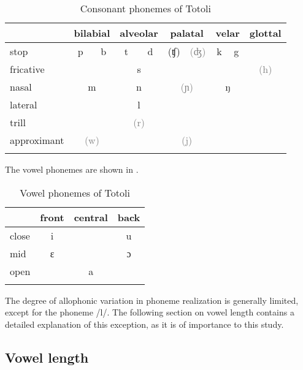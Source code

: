 \begin{table}
\caption{Consonant phonemes of Totoli}
\label{Consonant Chart}
\begin{tabular}{lccccccccc}
\lsptoprule
	& \multicolumn{2}{c}{bilabial} & \multicolumn{2}{c}{alveolar} & \multicolumn{2}{c}{palatal} & \multicolumn{2}{c}{velar} & glottal \\\midrule
	{stop} & p & b & t & d & {\textcolor{gray!90}{(ʧ)}}& {\textcolor{gray}{(ʤ)}} & k & g &  \\
	{fricative} &  &  & \multicolumn{2}{c}{s} & &  &  &  & {\textcolor{gray}{(h)}} \\
	{nasal} & \multicolumn{2}{c}{m} & \multicolumn{2}{c}{n} &  \multicolumn{2}{c}{{\textcolor{gray}{(ɲ)}}} & \multicolumn{2}{c}{ŋ} &  \\
	{lateral} &  &  & \multicolumn{2}{c}{l} &  & &  &  &  \\
	{trill} &  &  & \multicolumn{2}{c}{\textcolor{gray}{(r)}} &  &  & &  &  \\
	{approximant} & \multicolumn{2}{c}{\textcolor{gray}{(w)}} &  &  &\multicolumn{2}{c}{{\textcolor{gray}{(j)}}}   &   &  & \\
	\lspbottomrule
\end{tabular}
\end{table}





The vowel phonemes are shown in  . 


\begin{table}
	\caption{Vowel phonemes of Totoli}
	\label{Simplified vowel chart}
	\begin{tabular}{lccc}
		\lsptoprule
		& {front} & {central} & {back} \\ 
		\midrule
		close & i &  & u \\ 
		mid & ɛ &  & ɔ \\ 
		open &  & a &  \\ 
		\lspbottomrule
	\end{tabular}
\end{table}


The degree of allophonic variation in  phoneme realization is generally limited, except for the phoneme /l/. The following section on vowel length contains a detailed explanation of this exception, as it is of  importance to this study.



\subsection{Vowel length}
\label{subsubsection:Lateral /l/}

